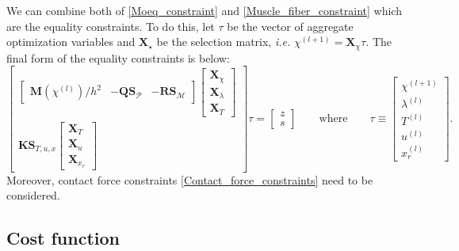 \documentclass[a4paper,10pt]{article}
\begin{document}
We can combine both of \eqref{Moeq_constraint} and \eqref{Muscle_fiber_constraint}
which are the equality constraints. To do this, let $\tau$ be the vector of aggregate
optimization variables and $\mathbf{X}_{\star}$ be the selection matrix,
\emph{i.e.} $\chi^{(l+1)} = \mathbf{X}_{\chi} \tau$.
The final form of the equality constraints is below:
\begin{equation}
\left [ \begin{array}{c}
\left [
\begin{array}{ccc}
\mathbf{M}(\chi^{(l)}) / h^2 & - \mathbf{Q} \mathbf{S}_\mathcal{P}  &  - \mathbf{R} \mathbf{S}_\mathcal{M}
\end{array}
\right ]
\left [
\begin{array}{c}
\mathbf{X}_\chi \\
\mathbf{X}_\lambda \\
\mathbf{X}_T
\end{array}
\right ]\\
\mathbf{K}\mathbf{S}_{T,u,x} \left [
\begin{array}{c}
\mathbf{X}_T \\ \mathbf{X}_u \\ \mathbf{X}_{x_r}
\end{array}
\right ]
\end{array}
\right ]
\tau
=
\left [
\begin{array}{c}
z\\
s
\end{array}
\right ]
\quad\quad
\text{where}
\quad\quad
\tau \equiv
\left [
\begin{array}{c}
\chi^{(l+1)} \\
\lambda^{(l)} \\
T^{(l)} \\
u^{(l)} \\
x_r^{(l)}
\end{array}
\right ].
\end{equation}
Moreover, contact force constraints \eqref{Contact_force_constraints}
need to be considered.

\subsection{Cost function}
\end{document}
